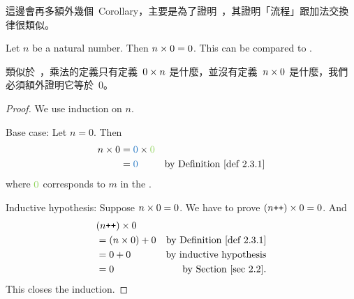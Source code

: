 \begin{note}
這邊會再多額外幾個\ Corollary，主要是為了證明\ ，其證明「流程」跟加法交換律很類似。
\end{note}

\begin{additional corollary} \label{ac 2.3.2}
Let \(n\) be a natural number. Then \(n \times 0 = 0\). This can be compared to .
\end{additional corollary}
\begin{note}
類似於\ ，乘法的定義只有定義\ \(0 \times n\) 是什麼，並沒有定義\ \(n \times 0\) 是什麼，我們必須額外證明它等於\ 0。
\end{note}
\begin{proof}
We use induction on \(n\).

Base case: Let \(n = 0\). Then
\begin{align*}
    n \X 0 & = \BLUE{0} \X \GREEN{0} \\
           & = \BLUE{0} & \text{by \DEF{2.3.1}}
\end{align*}
where \(\GREEN{0}\) corresponds to \(m\) in the .

Inductive hypothesis: Suppose \(n \times 0 = 0\). We have to prove \((n\texttt{++}) \times 0 = 0\). And
\begin{align*}
     & (n\INC) \X 0 \\
     & = (n \X 0) + 0 & \text{by \DEF{2.3.1}} \\
     & = 0 + 0 &  \text{by inductive hypothesis} \\
     & = 0 &  \text{by Section \ref{sec 2.2}.}
\end{align*}
This closes the induction.
\end{proof}

